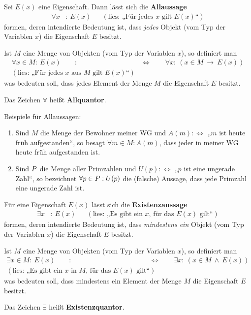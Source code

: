 \begin{defin}[Allaussage] \label{def:allquant}
    Sei $E(x)$ eine Eigenschaft. Dann lässt sich die \textbf{Allaussage}
    \begin{align*}
        \forall x &:\  E(x) && (\text{lies: „Für jedes $x$ gilt $E(x)$“})
    \end{align*}
    formen, deren intendierte Bedeutung ist, dass \emph{jedes} Objekt (vom Typ der Variablen $x$) die Eigenschaft $E$ besitzt.
    
    Ist $M$ eine Menge von Objekten (vom Typ der Variablen $x$), so definiert man
    \begin{align*}
        \forall x\in M:\ E(x) \qquad :& \Leftrightarrow\qquad \forall x:\ (x\in M\ \to\ E(x))  \\
        (\text{lies: „Für jedes $x$ aus $M$ gilt $E(x)$“}) &
    \end{align*}
    was bedeuten soll, dass jedes Element der Menge $M$ die Eigenschaft $E$ besitzt.
    
    Das Zeichen $\forall$ heißt \textbf{Allquantor}.
\end{defin}


\begin{bsp}
    Beispiele für Allaussagen:
    \begin{enumerate}
        \item Sind $M$ die Menge der Bewohner meiner WG und $A(m):\Leftrightarrow$ „$m$ ist heute früh aufgestanden“, so besagt $\forall m\in M: A(m)$, dass jeder in meiner WG heute früh aufgestanden ist.
        \item Sind $\relax P$ die Menge aller Primzahlen und $U(p):\Leftrightarrow$ „$p$ ist eine ungerade Zahl“, so bezeichnet $\forall p\in\relax P : U(p)$ die (falsche) Aussage, dass jede Primzahl eine ungerade Zahl ist.
    \end{enumerate}
\end{bsp}


\begin{defin}[Existenzaussage]\label{def:existquant}
    Für eine Eigenschaft $E(x)$ lässt sich die \textbf{Existenzaussage}
    \begin{align*}
        \exists x &:\ E(x) && (\text{lies: „Es gibt ein $x$, für das $E(x)$ gilt“})
    \end{align*}
    formen, deren intendierte Bedeutung ist, dass \emph{mindestens ein} Objekt (vom Typ der Variablen $x$) die Eigenschaft $E$ besitzt.
    
    Ist $M$ eine Menge von Objekten (vom Typ der Variablen $x$), so definiert man
    \begin{align*}
        \exists x\in M:\ E(x) \qquad :& \Leftrightarrow\qquad \exists x:\ (x\in M\ \land\ E(x))  \\
        (\text{lies: „Es gibt ein $x$ in $M$, für das $E(x)$ gilt“}) &
    \end{align*}
    was bedeuten soll, dass mindestens ein Element der Menge $M$ die Eigenschaft $E$ besitzt.
    
    Das Zeichen $\exists$ heißt \textbf{Existenzquantor}.
\end{defin}
    

